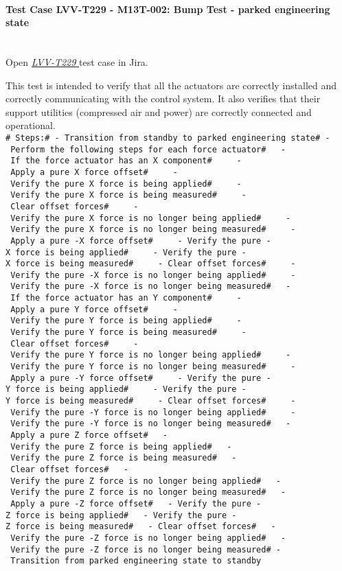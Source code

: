 \documentclass[SE,lsstdraft,STR,toc]{lsstdoc}
\begin{document}
\paragraph{Test Case LVV-T229 - M13T-002: Bump Test - parked engineering state }\mbox{}\\

Open  \href{https://jira.lsstcorp.org/secure/Tests.jspa#/testCase/LVV-T229}{\textit{ LVV-T229 } }
test case in Jira.

This test is intended to verify that all the actuators are correctly
installed and correctly communicating with the control system. It also
verifies that their support utilities (compressed air and power) are
correctly connected and
operational.\\[2\baselineskip]\texttt{\#\ Steps:\#\ -\ Transition\ from\ standby\ to\ parked\ engineering\ state\#\ -\ Perform\ the\ following\ steps\ for\ each\ force\ actuator\#\ ~\ -\ If\ the\ force\ actuator\ has\ an\ X\ component\#\ ~\ ~\ -\ Apply\ a\ pure\ X\ force\ offset\#\ ~\ ~\ -\ Verify\ the\ pure\ X\ force\ is\ being\ applied\#\ ~\ ~\ -\ Verify\ the\ pure\ X\ force\ is\ being\ measured\#\ ~\ ~\ -\ Clear\ offset\ forces\#\ ~\ ~\ -\ Verify\ the\ pure\ X\ force\ is\ no\ longer\ being\ applied\#\ ~\ ~\ -\ Verify\ the\ pure\ X\ force\ is\ no\ longer\ being\ measured\#\ ~\ ~\ -\ Apply\ a\ pure\ -X\ force\ offset\#\ ~\ ~\ -\ Verify\ the\ pure\ -X\ force\ is\ being\ applied\#\ ~\ ~\ -\ Verify\ the\ pure\ -X\ force\ is\ being\ measured\#\ ~\ ~\ -\ Clear\ offset\ forces\#\ ~\ ~\ -\ Verify\ the\ pure\ -X\ force\ is\ no\ longer\ being\ applied\#\ ~\ ~\ -\ Verify\ the\ pure\ -X\ force\ is\ no\ longer\ being\ measured\#\ ~\ -\ If\ the\ force\ actuator\ has\ an\ Y\ component\#\ ~\ ~\ -\ Apply\ a\ pure\ Y\ force\ offset\#\ ~\ ~\ -\ Verify\ the\ pure\ Y\ force\ is\ being\ applied\#\ ~\ ~\ -\ Verify\ the\ pure\ Y\ force\ is\ being\ measured\#\ ~\ ~\ -\ Clear\ offset\ forces\#\ ~\ ~\ -\ Verify\ the\ pure\ Y\ force\ is\ no\ longer\ being\ applied\#\ ~\ ~\ -\ Verify\ the\ pure\ Y\ force\ is\ no\ longer\ being\ measured\#\ ~\ ~\ -\ Apply\ a\ pure\ -Y\ force\ offset\#\ ~\ ~\ -\ Verify\ the\ pure\ -Y\ force\ is\ being\ applied\#\ ~\ ~\ -\ Verify\ the\ pure\ -Y\ force\ is\ being\ measured\#\ ~\ ~\ -\ Clear\ offset\ forces\#\ ~\ ~\ -\ Verify\ the\ pure\ -Y\ force\ is\ no\ longer\ being\ applied\#\ ~\ ~\ -\ Verify\ the\ pure\ -Y\ force\ is\ no\ longer\ being\ measured\#\ ~\ -\ Apply\ a\ pure\ Z\ force\ offset\#\ ~\ -\ Verify\ the\ pure\ Z\ force\ is\ being\ applied\#\ ~\ -\ Verify\ the\ pure\ Z\ force\ is\ being\ measured\#\ ~\ -\ Clear\ offset\ forces\#\ ~\ -\ Verify\ the\ pure\ Z\ force\ is\ no\ longer\ being\ applied\#\ ~\ -\ Verify\ the\ pure\ Z\ force\ is\ no\ longer\ being\ measured\#\ ~\ -\ Apply\ a\ pure\ -Z\ force\ offset\#\ ~\ -\ Verify\ the\ pure\ -Z\ force\ is\ being\ applied\#\ ~\ -\ Verify\ the\ pure\ -Z\ force\ is\ being\ measured\#\ ~\ -\ Clear\ offset\ forces\#\ ~\ -\ Verify\ the\ pure\ -Z\ force\ is\ no\ longer\ being\ applied\#\ ~\ -\ Verify\ the\ pure\ -Z\ force\ is\ no\ longer\ being\ measured\#\ -\ Transition\ from\ parked\ engineering\ state\ to\ standby}
\end{document}
